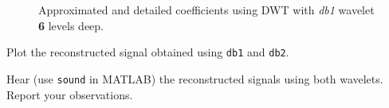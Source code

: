 \begin{figure}[H]
    \centering

    \caption{Approximated and detailed coefficients using DWT with \textit{db1} wavelet \textbf{6} levels deep. }
    \label{fig:Q1a}
\end{figure}



\begin{tcolorbox}[colback=red!5!white,colframe=red!75!black,title=Problem 1.b]
    Plot the reconstructed signal obtained using \verb|db1| and \verb|db2|.
\end{tcolorbox}



\begin{tcolorbox}[colback=red!5!white,colframe=red!75!black,title=Problem 1.c]
    Hear (use \verb|sound| in MATLAB) the reconstructed signals using both wavelets.
    Report your observations.
\end{tcolorbox}

